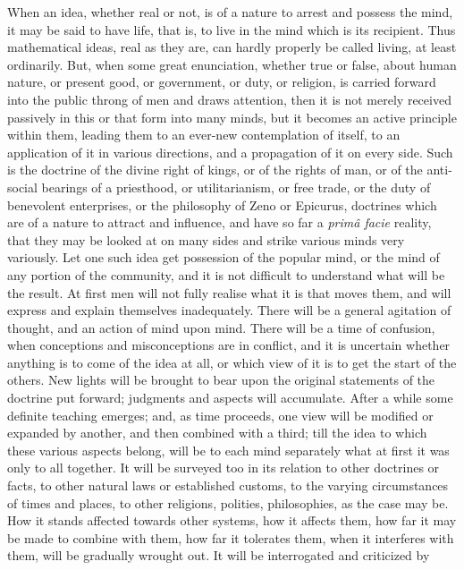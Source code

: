 When an idea, whether real or not, is of a nature to
arrest and possess the mind, it may be said to have life,
that is, to live in the mind which is its recipient. Thus
mathematical ideas, real as they are, can hardly properly
be called living, at least ordinarily. But, when some
great enunciation, whether true or false, about human
nature, or present good, or government, or duty, or
religion, is carried forward into the public throng of
men and draws attention, then it is not merely received
passively in this or that form into many minds, but it
becomes an active principle within them, leading them to
an ever-new contemplation of itself, to an application of
it in various directions, and a propagation of it on
every side. Such is the doctrine of the divine right of
kings, or of the rights of man, or of the anti-social
bearings of a priesthood, or utilitarianism, or free
trade, or the duty of benevolent enterprises, or the
philosophy of Zeno or Epicurus, doctrines which are of a
nature to attract and influence, and have so far a \emph{primâ
facie} reality, that they may be looked at on many
sides and strike various minds very variously. Let one
such idea get possession of the popular mind, or the mind
of any portion of the community, and it is not difficult
to understand what will be the result. At first men will
not fully realise what it is that moves them, and will
express and explain themselves inadequately. There will
be a general agitation of thought, and an action of mind
upon mind. There will be a time of confusion, when
conceptions and misconceptions are in conflict, and it is
uncertain whether anything is to come of the idea at all,
or which view of it is to get the start of the others.
New lights will be brought to bear upon the original
statements of the doctrine put forward; judgments and
aspects will accumulate. After a while some definite
teaching emerges; and, as time proceeds, one view will be
modified or expanded by another, and then combined with a
third; till the idea to which these various aspects
belong, will be to each mind separately what at first it
was only to all together. It will be surveyed too in its
relation to other doctrines or facts, to other natural
laws or established customs, to the varying circumstances
of times and places, to other religions, polities,
philosophies, as the case may be. How it stands affected
towards other systems, how it affects them, how far it
may be made to combine with them, how far it tolerates
them, when it interferes with them, will be gradually
wrought out. It will be interrogated and criticized by
